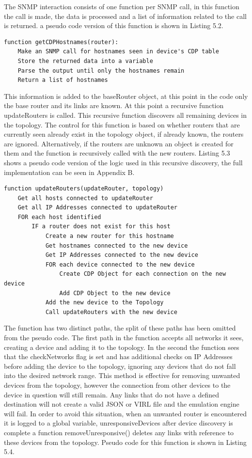 \documentclass[11pt]{report}
\begin{document}
The SNMP interaction consists of one function per SNMP call, in this function the call is made, the data is processed and a list of information related to the call is returned. a pseudo code version of this function is shown in Listing 5.2.

\begin{lstlisting}[caption=Pseudocode of an SNMP function]
function getCDPHostnames(router):
	Make an SNMP call for hostnames seen in device's CDP table
	Store the returned data into a variable
	Parse the output until only the hostnames remain
	Return a list of hostnames
\end{lstlisting}

This information is added to the baseRouter object, at this point in the code only the base router and its links are known. At this point a recursive function updateRouters is called. This recursive function discovers all remaining devices in the topology. The control for this function is based on whether routers that are currently seen already exist in the topology object, if already known, the routers are ignored. Alternatively, if the routers are unknown an object is created for them and the function is recursively called with the new routers. Listing 5.3 shows a pseudo code version of the logic used in this recursive discovery, the full implementation can be seen in Appendix B.

\pagebreak
\begin{lstlisting}[caption=Pseudocode of the updateRouters function]
function updateRouters(updateRouter, topology)
	Get all hosts connected to updateRouter
	Get all IP Addresses connected to updateRouter
	FOR each host identified
		IF a router does not exist for this host
			Create a new router for this hostname
			Get hostnames connected to the new device
			Get IP Addresses connected to the new device
			FOR each device connected to the new device
				Create CDP Object for each connection on the new device
				Add CDP Object to the new device
			Add the new device to the Topology
			Call updateRouters with the new device
\end{lstlisting}

The function has two distinct paths, the split of these paths has been omitted from the pseudo code. The first path in the function accepts all networks it sees, creating a device and adding it to the topology. In the second the function sees that the checkNetworks flag is set and has additional checks on IP Addresses before adding the device to the topology, ignoring any devices that do not fall into the desired network range. This method is effective for removing unwanted devices from the topology, however the connection from other devices to the device in question will still remain. Any links that do not have a defined destination will not create a valid JSON or VIRL file and the emulation engine will fail. In order to avoid this situation, when an unwanted router is encountered it is logged to a global variable, unresponsiveDevices after device discovery is complete a function removeUnresponsive() deletes any links with reference to these devices from the topology. Pseudo code for this function is shown in Listing 5.4.
\end{document}
